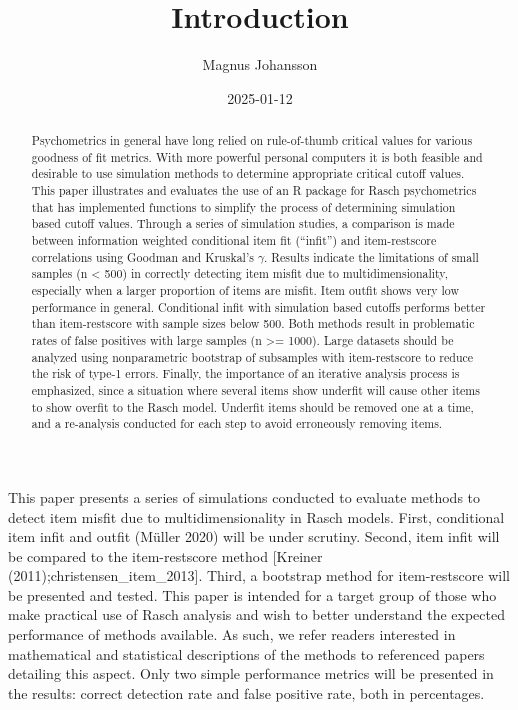 \documentclass[
  letterpaper,
  DIV=11,
  numbers=noendperiod]{scrartcl}
\title{Introduction}
\author{Magnus Johansson}
\date{2025-01-12}
\begin{document}
\maketitle
\begin{abstract}
Psychometrics in general have long relied on rule-of-thumb critical
values for various goodness of fit metrics. With more powerful personal
computers it is both feasible and desirable to use simulation methods to
determine appropriate critical cutoff values. This paper illustrates and
evaluates the use of an R package for Rasch psychometrics that has
implemented functions to simplify the process of determining simulation
based cutoff values. Through a series of simulation studies, a
comparison is made between information weighted conditional item fit
(``infit'') and item-restscore correlations using Goodman and Kruskal's
\(\gamma\). Results indicate the limitations of small samples (n
\textless{} 500) in correctly detecting item misfit due to
multidimensionality, especially when a larger proportion of items are
misfit. Item outfit shows very low performance in general. Conditional
infit with simulation based cutoffs performs better than item-restscore
with sample sizes below 500. Both methods result in problematic rates of
false positives with large samples (n \textgreater= 1000). Large
datasets should be analyzed using nonparametric bootstrap of subsamples
with item-restscore to reduce the risk of type-1 errors. Finally, the
importance of an iterative analysis process is emphasized, since a
situation where several items show underfit will cause other items to
show overfit to the Rasch model. Underfit items should be removed one at
a time, and a re-analysis conducted for each step to avoid erroneously
removing items.
\end{abstract}


This paper presents a series of simulations conducted to evaluate
methods to detect item misfit due to multidimensionality in Rasch
models. First, conditional item infit and outfit (Müller 2020) will be
under scrutiny. Second, item infit will be compared to the
item-restscore method {[}Kreiner (2011);christensen\_item\_2013{]}.
Third, a bootstrap method for item-restscore will be presented and
tested. This paper is intended for a target group of those who make
practical use of Rasch analysis and wish to better understand the
expected performance of methods available. As such, we refer readers
interested in mathematical and statistical descriptions of the methods
to referenced papers detailing this aspect. Only two simple performance
metrics will be presented in the results: correct detection rate and
false positive rate, both in percentages.
\end{document}
